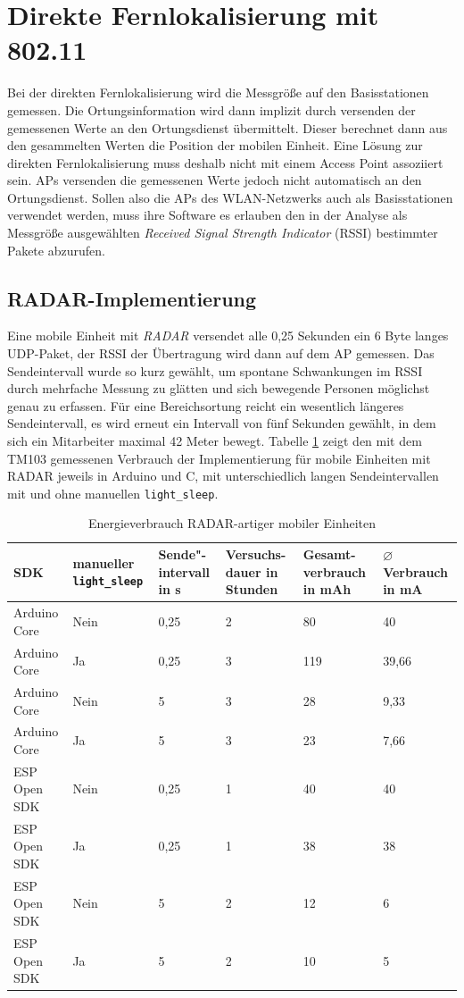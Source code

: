 \section{Direkte Fernlokalisierung mit 802.11}
\label{ch:phase2}
Bei der direkten Fernlokalisierung wird die Messgröße auf den Basisstationen gemessen.
Die Ortungsinformation wird dann implizit durch versenden der gemessenen Werte an den Ortungsdienst übermittelt.
Dieser berechnet dann aus den gesammelten Werten die Position der mobilen Einheit.
Eine Lösung zur direkten Fernlokalisierung muss deshalb nicht mit einem Access Point assoziiert sein.
APs versenden die gemessenen Werte jedoch nicht automatisch an den Ortungsdienst. 
Sollen also die APs des WLAN-Netzwerks auch als Basisstationen verwendet werden, muss ihre Software es erlauben den in der Analyse als Messgröße ausgewählten \emph{Received Signal Strength Indicator} (RSSI) bestimmter Pakete abzurufen.

\subsection{RADAR-Implementierung}
Eine mobile Einheit mit \emph{RADAR} versendet alle 0,25 Sekunden ein 6 Byte langes UDP-Paket, der RSSI der Übertragung wird dann auf dem AP gemessen.
Das Sendeintervall wurde so kurz gewählt, um spontane Schwankungen im RSSI durch mehrfache Messung zu glätten und sich bewegende Personen möglichst genau zu erfassen.
Für eine Bereichsortung reicht ein wesentlich längeres Sendeintervall, es wird erneut ein Intervall von fünf Sekunden gewählt, in dem sich ein Mitarbeiter maximal 42 Meter bewegt. 
Tabelle \ref{table:radarconsumption} zeigt den mit dem TM103 gemessenen Verbrauch der Implementierung für mobile Einheiten mit RADAR jeweils in Arduino und C, mit unterschiedlich langen Sendeintervallen mit und ohne manuellen \texttt{light\_sleep}.

\begin{table}[h]
	\centering
	\caption{Energieverbrauch RADAR-artiger mobiler Einheiten}
	\label{table:radarconsumption}
	\begin{tabular}{p{3cm}|p{2.2cm}|p{1.5cm}|p{2cm}|p{2cm}|p{2cm}}
		SDK & manueller \texttt{light\_sleep} & Sende"-intervall in s & Versuchs-dauer in Stunden & Gesamt-verbrauch in mAh & $\varnothing$ Verbrauch in mA \\
		\hline
		Arduino Core & Nein & 0,25 & 2 & 80 & 40 \\
		Arduino Core & Ja & 0,25 & 3 & 119 & 39,66 \\
		Arduino Core & Nein & 5 & 3 & 28 & 9,33 \\
		Arduino Core & Ja & 5 & 3 & 23 & 7,66 \\
		ESP Open SDK & Nein & 0,25 & 1 & 40 & 40 \\
		ESP Open SDK & Ja & 0,25 & 1 & 38 & 38 \\
		ESP Open SDK & Nein & 5 & 2 & 12 & 6 \\
		ESP Open SDK & Ja & 5 & 2 & 10 & 5 \\
	\end{tabular}
\end{table}

